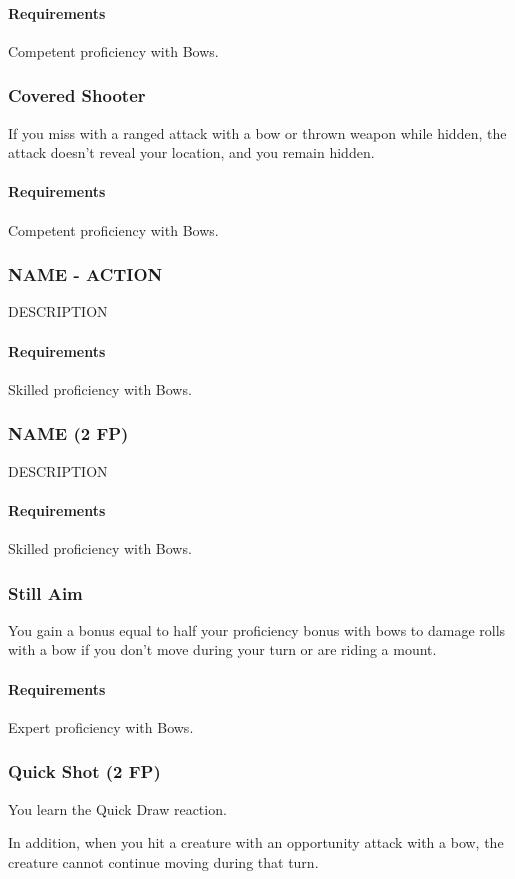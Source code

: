     \paragraph{Requirements} Competent proficiency with Bows.
\subsubsection{Covered Shooter} \label{feat::coveredshooter}
    If you miss with a ranged attack with a bow or thrown weapon while hidden, the attack doesn't reveal your location, and you remain hidden.
    \paragraph{Requirements} Competent proficiency with Bows.
\subsubsection{NAME - ACTION} \label{feat::name}
    DESCRIPTION
    \paragraph{Requirements} Skilled proficiency with Bows.
\subsubsection{NAME (2 FP)} \label{feat::name}
    DESCRIPTION
    \paragraph{Requirements} Skilled proficiency with Bows.
\subsubsection{Still Aim} \label{feat::stillaim}
    You gain a bonus equal to half your proficiency bonus with bows to damage rolls with a bow if you don't move during your turn or are riding a mount.
    \paragraph{Requirements} Expert proficiency with Bows.
\subsubsection{Quick Shot (2 FP)} \label{feat::quickshot}
    You learn the Quick Draw reaction.

    In addition, when you hit a creature with an opportunity attack with a bow, the creature cannot continue moving during that turn.
